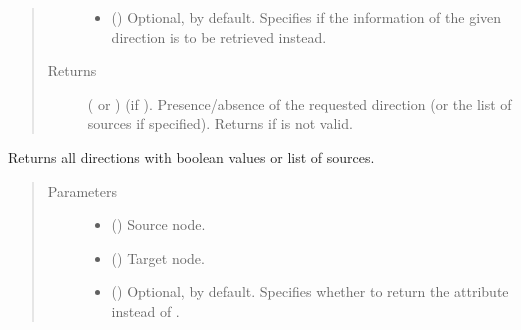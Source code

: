 \documentclass[letterpaper,10pt,english]{sphinxmanual}
\begin{document}
\begin{fulllineitems}
\begin{fulllineitems}
\begin{quote}
\begin{description}
\begin{itemize}
\item {} 
 () \textendash{} Optional,  by default. Specifies if the
 information of the given direction is to
be retrieved instead.

\end{itemize}

\item[{Returns}] \leavevmode
( or ) \textendash{} (if ). Presence/absence
of the requested direction (or the list of sources if
specified). Returns  if  is not valid.

\end{description}\end{quote}

\end{fulllineitems}


\begin{fulllineitems}
\label{\detokenize{reference:pypath.main.Direction.get_dirs}}
Returns all directions with boolean values or list of sources.
\begin{quote}\begin{description}
\item[{Parameters}] \leavevmode\begin{itemize}
\item {} 
 () \textendash{} Source node.

\item {} 
 () \textendash{} Target node.

\item {} 
 () \textendash{} Optional,  by default. Specifies whether to return
the  attribute instead of .


\end{itemize}
\end{description}
\end{quote}
\end{fulllineitems}
\end{fulllineitems}
\end{document}
